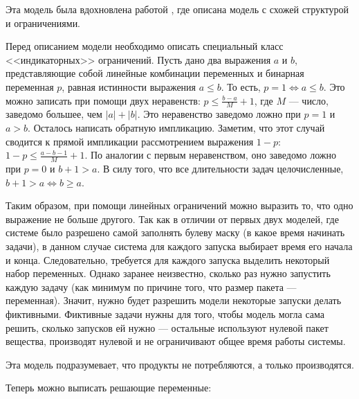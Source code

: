 \documentclass[12pt, twoside]{article}
\theoremstyle{definition}
\begin{document}
Эта модель была вдохновлена работой \cite{precendancebased}, где описана модель с схожей структурой и ограничениями.

Перед описанием модели необходимо описать специальный класс <<индикаторных>> ограничений. Пусть дано два выражения $a$ и $b$, представляющие собой линейные комбинации переменных и бинарная переменная $p$, равная истинности выражения $a \leq b$. То есть, $p = 1 \Leftrightarrow a \leq b$. Это можно записать при помощи двух неравенств: $p \leq \frac{b-a}{M} + 1$, где $M$ --- число, заведомо большее, чем $|a| + |b|$. Это неравенство заведомо ложно при $p = 1$ и $a > b$. Осталось написать обратную импликацию. Заметим, что этот случай сводится к прямой импликации рассмотрением выражения $1 - p$: $1 - p \leq \frac{a - b - 1}{M} + 1$. По аналогии с первым неравенством, оно заведомо ложно при $p = 0$ и $b + 1 > a$. В силу того, что все длительности задач целочисленные, $b + 1 > a \Leftrightarrow b \geq a$.

Таким образом, при помощи линейных ограничений можно выразить то, что одно выражение не больше другого. Так как в отличии от первых двух моделей, где системе было разрешено самой заполнять булеву маску (в какое время начинать задачи), в данном случае система для каждого запуска выбирает время его начала и конца. Следовательно, требуется для каждого запуска выделить некоторый набор переменных. Однако заранее неизвестно, сколько раз нужно запустить каждую задачу (как минимум по причине того, что размер пакета --- переменная). Значит, нужно будет разрешить модели некоторые запуски делать фиктивными. Фиктивные задачи нужны для того, чтобы модель могла сама решить, сколько запусков ей нужно --- остальные используют нулевой пакет вещества, производят нулевой и не ограничивают общее время работы системы.

Эта модель подразумевает, что продукты не потребляются, а только производятся.

Теперь можно выписать решающие переменные:
\end{document}
